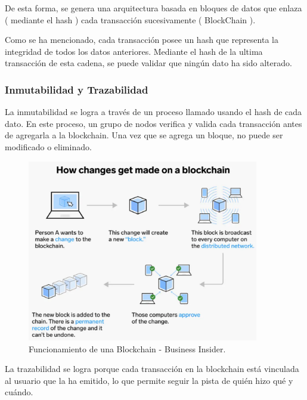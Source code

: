 De esta forma, se genera una arquitectura basada en bloques de datos que enlaza ( mediante el hash ) cada transacción sucesivamente ( BlockChain ).

\bigskip

Como se ha mencionado, cada transacción posee un hash que representa la integridad de todos los datos anteriores. Mediante el hash de la ultima transacción de esta cadena, se puede validar que ningún dato ha sido alterado.


\subsubsection{Inmutabilidad y Trazabilidad}

La inmutabilidad se logra a través de un proceso llamado  usando el hash de cada dato. En este proceso, un grupo de nodos verifica y valida cada transacción antes de agregarla a la blockchain. Una vez que se agrega un bloque, no puede ser modificado o eliminado.

\begin{figure}[H]
        \centering
        \includegraphics[width=0.9\textwidth]{img/capturas/cambios.png}
        \caption{Funcionamiento de una Blockchain - Business Insider.}
        \label{fig:configApi}
\end{figure}


\bigskip

La trazabilidad se logra porque cada transacción en la blockchain está vinculada al usuario que la ha emitido, lo que permite seguir la pista de quién hizo qué y cuándo.

\bigskip

